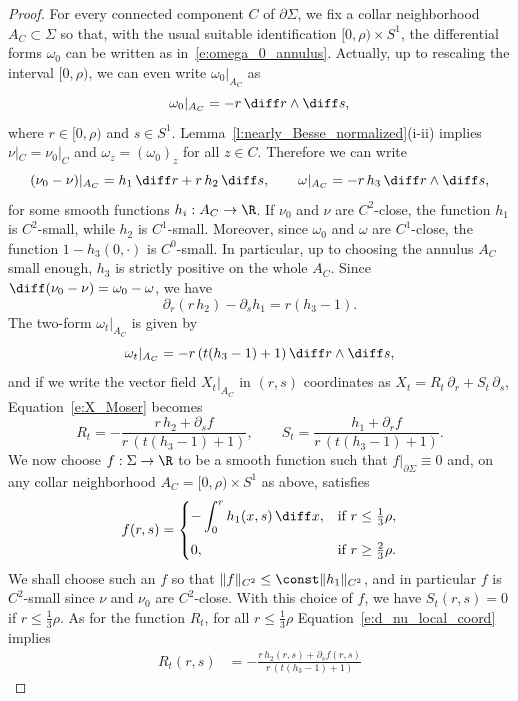 \begin{proof}
For every connected component $C$ of $\partial\Sigma$, we fix a collar neighborhood $A_C\subset\Sigma$ so that, with the usual suitable identification $[0,\rho)\times S^1$, the differential forms $\omega_0$ can be written as in~\eqref{e:omega_0_annulus}. Actually, up to rescaling the interval $[0,\rho)$, we can even write $\omega_0|_{A_C}$ as
\[
\omega_0|_{A_C}=-r\,\diff r\wedge\diff s,
\]
where $r\in[0,\rho)$ and $s\in S^1$. Lemma~\ref{l:nearly_Besse_normalized}(i-ii) implies $\nu|_C=\nu_0|_C$ and $\omega_z=(\omega_0)_z$ for all $z\in C$. Therefore we can write
\[
(\nu_0-\nu)|_{A_C} = h_1\,\diff r + r\,h_2\,\diff s,
\qquad
\omega|_{A_C} = -r\, h_3\, \diff r\wedge\diff s,
\]
for some smooth functions $h_i:A_C\to\R$. If $\nu_0$ and $\nu$ are $C^2$-close, the function $h_1$ is $C^2$-small, while $h_2$ is $C^1$-small. Moreover, since $\omega_0$ and $\omega$ are $C^1$-close, the function $1-h_3(0,\cdot)$ is $C^0$-small. In particular, up to choosing the annulus $A_C$ small enough, $h_3$ is strictly positive on the whole $A_C$. Since $\diff(\nu_0-\nu)=\omega_0-\omega$, we have
\begin{equation}
\label{e:d_nu_local_coord}
\partial_r(r\, h_2)- \partial_s h_1 = r (h_3 - 1).
\end{equation}
The two-form $\omega_t|_{A_C}$ is given by
\[
\omega_t|_{A_C}=-r\,(t(h_3-1)+1)\,\diff r\wedge\diff s,
\]
and if we write the vector field $X_t|_{A_C}$ in $(r,s)$ coordinates as $X_t=R_t\,\partial_r + S_t\,\partial_s$, Equation~\eqref{e:X_Moser} becomes
\[
R_t = -\frac {r\, h_2 + \partial_s f}{r\,(t(h_3-1)+1)},\qquad
S_t = \frac { h_1 + \partial_r f}{r\,(t(h_3-1)+1)}.
\]
We now choose $f:\Sigma\to\R$ to be a smooth function such that $f|_{\partial\Sigma}\equiv0$ and, on any collar neighborhood $A_C=[0,\rho)\times S^1$ as above, satisfies
\[
f(r,s)
=
\begin{cases}
\displaystyle -\int_0^r h_1(x,s)\,\diff x, & \mbox{if }r\leq\tfrac13\rho, \vspace{5pt} \\
0, & \mbox{if }r\geq\tfrac23\rho.
\end{cases}
\]
We shall choose such an $f$ so that $\|f\|_{C^2}\leq\const\|h_1\|_{C^2}$, and in particular $f$ is $C^2$\nobreakdash-small since $\nu$ and $\nu_0$ are $C^2$-close. With this choice of $f$, we have $S_t(r,s)=0$ if $r\leq\tfrac13\rho$. As for the function $R_t$, for all $r\leq\tfrac13\rho$ Equation~\eqref{e:d_nu_local_coord} implies
\begin{align*}
R_t(r,s)
&=
-\frac {r\, h_2(r,s) + \partial_s f(r,s)}{r\,(t(h_3-1)+1)}

\end{align*}
\end{proof}
